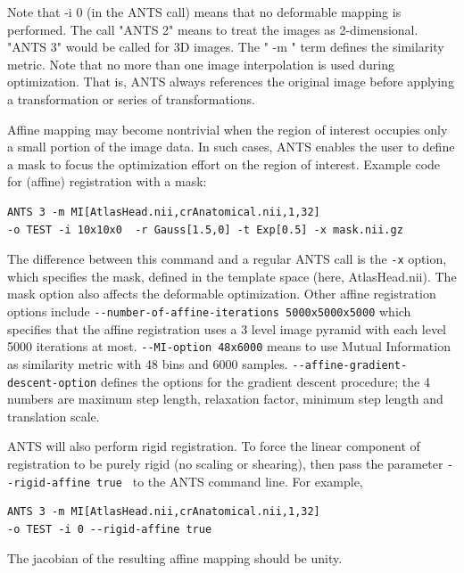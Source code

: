 \documentclass{InsightArticle}
\begin{document}
Note that -i 0 (in the ANTS call) means that no deformable mapping is performed. The call "ANTS 2" means to treat the images as 2-dimensional. "ANTS 3" would be called for 3D images. The " -m " term defines the similarity metric. 
Note that no more than one image interpolation is used during optimization.  
That is, ANTS always references the original image before applying a transformation or series of transformations. 

Affine mapping may become nontrivial when the region of interest 
occupies only a small portion of the image data.  In such cases, 
ANTS enables the user to define a mask to focus the optimization 
effort on the region of interest.  
Example code for (affine) registration with a mask: 
\begin{verbatim}
ANTS 3 -m MI[AtlasHead.nii,crAnatomical.nii,1,32] 
-o TEST -i 10x10x0  -r Gauss[1.5,0] -t Exp[0.5] -x mask.nii.gz
\end{verbatim}
The difference between this command 
and a regular ANTS call is the \verb"-x" option, which specifies the mask, defined in the 
template space (here, AtlasHead.nii).   The mask option also affects the deformable optimization. 
Other affine registration options include  \verb"--number-of-affine-iterations 5000x5000x5000" which specifies that the affine registration uses a 3 level image pyramid with each level 5000 iterations at most. \verb"--MI-option 48x6000" means to use Mutual Information as similarity metric with 48 bins and 6000 samples. \verb"--affine-gradient-descent-option" defines the options for the gradient descent procedure; the 4 numbers are maximum step length, relaxation factor, minimum step length and translation scale.  


  ANTS will also perform rigid registration.  
To force the linear component of registration to be purely rigid (no scaling or shearing), 
then pass the parameter  \verb"--rigid-affine true " to 
the ANTS command line.   For example,  
\begin{verbatim}
ANTS 3 -m MI[AtlasHead.nii,crAnatomical.nii,1,32] 
-o TEST -i 0 --rigid-affine true 
\end{verbatim}
The jacobian of the resulting affine mapping should be unity. 
\end{document}

